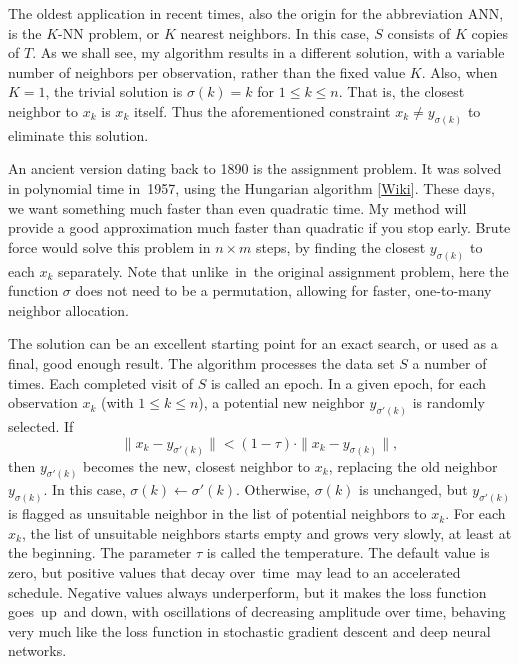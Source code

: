 \documentclass[oneside,10pt]{book}
\begin{document}
The oldest application in recent times, also the origin for the  abbreviation ANN, is the 
$K$-NN problem, or \textcolor{index}{$K$ nearest neighbors}. 
In this case, $S$ consists of $K$ copies of $T$. As we shall see, my algorithm results in a different solution,
 with a variable number of neighbors per observation, rather than the fixed value $K$. Also, when $K=1$,
 the trivial solution is $\sigma(k) = k$ for $1\leq k \leq n$. That is, the closest neighbor to $x_k$ is $x_k$ itself. 
Thus the aforementioned constraint
 $x_k \neq y_{\sigma(k)}$ to eliminate this solution. 

An ancient version dating back to 1890 is the assignment problem. It was solved in polynomial time in~1957, 
 using the \textcolor{index}{Hungarian algorithm} [\href{https://en.wikipedia.org/wiki/Hungarian_algorithm}{Wiki}]. These days, we want something much faster than even quadratic time.
My method will provide a good approximation much faster than quadratic if you stop early. Brute force would solve this problem in $n\times m$ steps, by finding the closest $y_{\sigma(k)}$ to each $x_k$ separately. Note that 
unlike~in~the original assignment problem, here the function $\sigma$ does not need to be a permutation, 
 allowing for faster,  one-to-many neighbor allocation.





The solution can be an excellent starting point for an exact search, or used as a final, good enough result. 
The algorithm processes the data set $S$ a number of times. Each completed visit of $S$ is called   
an \textcolor{index}{epoch}. In a given epoch, for each observation
 $x_k$ (with $1\leq k \leq n$), a potential new neighbor $y_{\sigma'(k)}$ is randomly selected. 
If 
$$
\| x_k - y_{\sigma'(k)}\|  < (1-\tau)\cdot \| x_k - y_{\sigma(k)}\|,
$$
then $y_{\sigma'(k)}$ becomes the new, closest neighbor to $x_k$, replacing the old neighbor 
$y_{\sigma(k)}$. In this case,  $\sigma(k) \leftarrow \sigma'(k)$. Otherwise, $\sigma(k)$ is unchanged, but $y_{\sigma'(k)}$ is flagged as unsuitable neighbor 
 in the list of potential neighbors to $x_k$. For each $x_k$, the list of unsuitable neighbors starts empty and grows very slowly, at least at the beginning. The parameter $\tau$ is called the temperature. The default value is zero,
 but positive values that decay over~time~may lead to an accelerated schedule. Negative values always underperform, 
 but it makes the loss function goes~up~and down, with oscillations of decreasing amplitude over time, behaving very much like the loss function in stochastic gradient descent and deep neural networks. 
\end{document}
